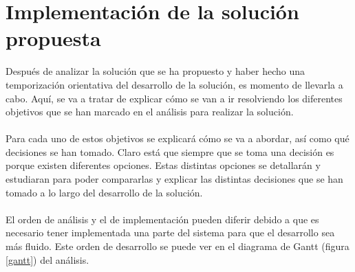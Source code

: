 \chapter{Implementación de la solución propuesta}
Después de analizar la solución que se ha propuesto y haber hecho una temporización orientativa del desarrollo de la solución, es momento de llevarla a cabo. Aquí, se va a tratar de explicar cómo se van a ir resolviendo los diferentes objetivos que se han marcado en el análisis para realizar la solución.
\\\\
Para cada uno de estos objetivos se explicará cómo se va a abordar, así como qué decisiones se han tomado. Claro está que siempre que se toma una decisión es porque existen diferentes opciones. Estas distintas opciones se detallarán y estudiaran para poder compararlas y explicar las distintas decisiones que se han tomado a lo largo del desarrollo de la solución.
\\\\
El orden de análisis y el de implementación pueden diferir debido a que es necesario tener implementada una parte del sistema para que el desarrollo sea más fluido. Este orden de desarrollo se puede ver en el diagrama de Gantt (figura  \ref{gantt}) del análisis.

